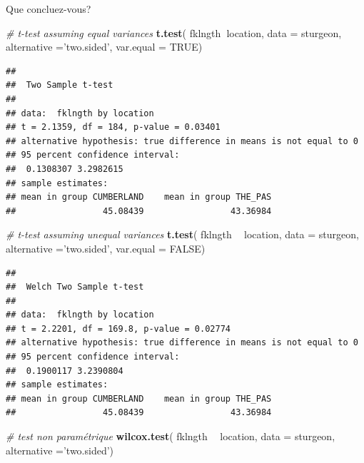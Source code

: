 \documentclass[12pt,]{book}
\newenvironment{Shaded}{\begin{snugshade}}{\end{snugshade}}
\newcommand{\CommentTok}[1]{\textcolor[rgb]{0.56,0.35,0.01}{\textit{#1}}}
\newcommand{\DataTypeTok}[1]{\textcolor[rgb]{0.13,0.29,0.53}{#1}}
\newcommand{\KeywordTok}[1]{\textcolor[rgb]{0.13,0.29,0.53}{\textbf{#1}}}
\newcommand{\NormalTok}[1]{#1}
\newcommand{\OperatorTok}[1]{\textcolor[rgb]{0.81,0.36,0.00}{\textbf{#1}}}
\newcommand{\OtherTok}[1]{\textcolor[rgb]{0.56,0.35,0.01}{#1}}
\newcommand{\StringTok}[1]{\textcolor[rgb]{0.31,0.60,0.02}{#1}}
\begin{document}
Que concluez-vous?

\begin{Shaded}
\begin{Highlighting}[]
\CommentTok{# t-test assuming equal variances}
 \KeywordTok{t.test}\NormalTok{(}
\NormalTok{   fklngth}\OperatorTok{~}\NormalTok{location, }\DataTypeTok{data =}\NormalTok{ sturgeon,}
   \DataTypeTok{alternative =}\StringTok{'two.sided'}\NormalTok{,}
   \DataTypeTok{var.equal =} \OtherTok{TRUE}\NormalTok{)}
\end{Highlighting}
\end{Shaded}

\begin{verbatim}
## 
##  Two Sample t-test
## 
## data:  fklngth by location
## t = 2.1359, df = 184, p-value = 0.03401
## alternative hypothesis: true difference in means is not equal to 0
## 95 percent confidence interval:
##  0.1308307 3.2982615
## sample estimates:
## mean in group CUMBERLAND    mean in group THE_PAS 
##                 45.08439                 43.36984
\end{verbatim}

\begin{Shaded}
\begin{Highlighting}[]
\CommentTok{# t-test assuming unequal variances}
 \KeywordTok{t.test}\NormalTok{(}
\NormalTok{   fklngth }\OperatorTok{~}\StringTok{ }\NormalTok{location, }\DataTypeTok{data =}\NormalTok{ sturgeon,}
   \DataTypeTok{alternative =}\StringTok{'two.sided'}\NormalTok{,}
   \DataTypeTok{var.equal =} \OtherTok{FALSE}\NormalTok{)}
\end{Highlighting}
\end{Shaded}

\begin{verbatim}
## 
##  Welch Two Sample t-test
## 
## data:  fklngth by location
## t = 2.2201, df = 169.8, p-value = 0.02774
## alternative hypothesis: true difference in means is not equal to 0
## 95 percent confidence interval:
##  0.1900117 3.2390804
## sample estimates:
## mean in group CUMBERLAND    mean in group THE_PAS 
##                 45.08439                 43.36984
\end{verbatim}

\begin{Shaded}
\begin{Highlighting}[]
\CommentTok{# test non paramétrique}
 \KeywordTok{wilcox.test}\NormalTok{(}
\NormalTok{   fklngth }\OperatorTok{~}\StringTok{ }\NormalTok{location, }\DataTypeTok{data =}\NormalTok{ sturgeon,}
   \DataTypeTok{alternative =}\StringTok{'two.sided'}\NormalTok{)}
\end{Highlighting}
\end{Shaded}
\end{document}
